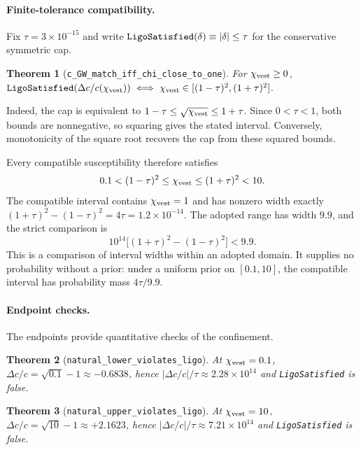 \documentclass[aps,prl,reprint,nofootinbib,superscriptaddress]{revtex4-2}
\newtheorem{theorem}{Theorem}
\newcommand{\chivest}{\chi_{\rm vest}}
\newcommand{\dccap}{\Delta c/c}
\begin{document}
\paragraph{Finite-tolerance compatibility.}
Fix $\tau=3\times10^{-15}$ and write
$\verb|LigoSatisfied|(\delta)\equiv|\delta|\leq\tau$
for the conservative symmetric cap.

\begin{theorem}[\texttt{c\_GW\_match\_iff\_chi\_close\_to\_one}]
  \label{thm:bicond}
  For $\chivest\geq0$,
  $\verb|LigoSatisfied|(\dccap(\chivest))
  \;\Longleftrightarrow\;
  \chivest\in[(1-\tau)^2,(1+\tau)^2]$.
\end{theorem}

Indeed, the cap is equivalent to
$1-\tau\leq\sqrt{\chivest}\leq1+\tau$.
Since $0<\tau<1$, both bounds are nonnegative, so squaring
gives the stated interval. Conversely, monotonicity of the
square root recovers the cap from these squared bounds.

Every compatible susceptibility therefore satisfies
\[
  0.1<(1-\tau)^2\leq\chivest\leq(1+\tau)^2<10.
\]
The compatible interval contains $\chivest=1$ and has nonzero width exactly
$(1+\tau)^2-(1-\tau)^2=4\tau=1.2\times10^{-14}$.
The adopted range has width $9.9$, and the strict comparison is
\[
  10^{14}\bigl[(1+\tau)^2-(1-\tau)^2\bigr]<9.9.
\]
This is a comparison of interval widths within an adopted domain.
It supplies no probability without a prior: under a uniform prior
on $[0.1,10]$, the compatible interval has probability mass
$4\tau/9.9$.

\paragraph{Endpoint checks.}
The endpoints provide quantitative checks of the confinement.

\begin{theorem}[\texttt{natural\_lower\_violates\_ligo}]
  \label{thm:falsifier-lower}
  At $\chivest=0.1$, $\dccap=\sqrt{0.1}-1\approx-0.6838$,
  hence $|\dccap|/\tau\approx2.28\times10^{14}$ and
  \verb|LigoSatisfied| is false.
\end{theorem}

\begin{theorem}[\texttt{natural\_upper\_violates\_ligo}]
  \label{thm:falsifier-upper}
  At $\chivest=10$, $\dccap=\sqrt{10}-1\approx+2.1623$,
  hence $|\dccap|/\tau\approx7.21\times10^{14}$ and
  \verb|LigoSatisfied| is false.
\end{theorem}
\end{document}
